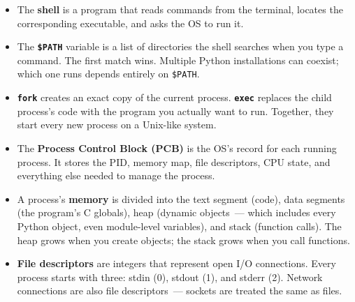 \label{01-command-to-process:key-takeaways}
\begin{takeaways}

\begin{itemize}
\tightlist
\item
  The \textbf{shell} is a program that reads commands from the terminal, locates the corresponding executable, and asks the OS to run it.
\item
  The \textbf{\texttt{\$PATH}} variable is a list of directories the shell searches when you type a command. The first match wins. Multiple Python installations can coexist; which one runs depends entirely on \texttt{\$PATH}.
\item
  \textbf{\texttt{fork}} creates an exact copy of the current process. \textbf{\texttt{exec}} replaces the child process's code with the program you actually want to run. Together, they start every new process on a Unix-like system.
\item
  The \textbf{Process Control Block (PCB)} is the OS's record for each running process. It stores the PID, memory map, file descriptors, CPU state, and everything else needed to manage the process.
\item
  A process's \textbf{memory} is divided into the text segment (code), data segments (the program's C globals), heap (dynamic objects~--- which includes every Python object, even module-level variables), and stack (function calls). The heap grows when you create objects; the stack grows when you call functions.
\item
  \textbf{File descriptors} are integers that represent open I/O connections. Every process starts with three: stdin (0), stdout (1), and stderr (2). Network connections are also file descriptors~--- sockets are treated the same as files.
\end{itemize}

\end{takeaways}

\label{01-command-to-process:exercises}

